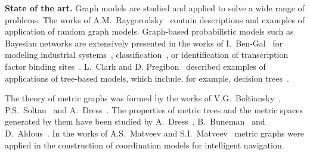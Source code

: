


\textbf{State of the art.}
Graph models are studied and applied to solve a wide range of problems.
The works of A.M.~Raygorodsky~\cite{райгородский2010модели,райгородский2022модели} contain descriptions and examples of application of random graph models.
Graph-based probabilistic models such as Bayesian networks are extensively presented in the works of I.~Ben-Gal~\cite{ben2008bayesian} for modeling industrial systems~\cite{gruber2012efficient}, classification~\cite{gruber2019targeted}, or identification of transcription factor binding sites~\cite{ben2005identification}.
L.~Clark and D. Pregibon~\cite{clark2017tree} described examples of applications of tree-based models, which include, for example, decision trees~\cite{kotsiantis2013decision}.

The theory of metric graphs was formed by the works of V.G.~Boltiansky~\cite{болтянский1978комбинаторная}, P.S.~Soltan~\cite{soltan1973экстремальные,болтянский1978комбинаторная} and A.~Dress~\cite{dress1984trees}.
The properties of metric trees and the metric spaces generated by them have been studied by A.~Dress~\cite{dress1984trees}, B.~Buneman~\cite{buneman1974note} and D.~Aldous~\cite{aldous1991continuum_i,aldous1991continuum,aldous1991continuum,aldous1993continuum}.
In the works of A.S.~Matveev and S.I.~Matveev~\cite{матвеев2010создание,лёвин2011системы,матвеев2013интеллектуальная} metric graphs were applied in the construction of coordination models for intelligent navigation.

